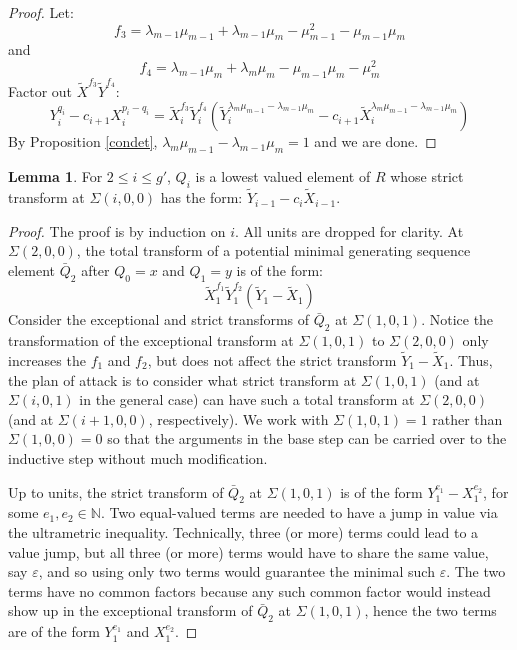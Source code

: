 \documentclass[11pt]{amsart}
\theoremstyle{definition}
\newtheorem{lem}[thm]{Lemma}
\begin{document}
{\begin{proof}
Let:
\begin{equation*}
f_3=\lambda_{m-1}\mu_{m-1}+\lambda_{m-1}\mu_m-\mu_{m-1}^2-\mu_{m-1}\mu_m
\end{equation*}
and
\begin{equation*}
f_4=\lambda_{m-1}\mu_m+\lambda_m\mu_m-\mu_{m-1}\mu_m-\mu_m^2
\end{equation*}
Factor out $\tilde X^{f_3}\tilde Y^{f_4}$:
\begin{equation*}
Y_{i}^{q_i} - c_{i+1}X_{i}^{p_i-q_i} = \tilde X_i^{f_3} \tilde Y_i^{f_4}\left(\tilde Y_i^{\lambda_m \mu_{m-1} - \lambda_{m-1} \mu_m} - c_{i+1}\tilde X_i^{\lambda_m\mu_{m-1}-\lambda_{m-1}\mu_m}\right)
\end{equation*}
By Proposition \ref{condet}, $\lambda_m\mu_{m-1}-\lambda_{m-1}\mu_m=1$ and we are done.
\end{proof}

\begin{lem} \label{minimalvalue}
For $2\leq i\leq g'$, $Q_i$ is a lowest valued element of $R$ whose strict transform at $\Sigma(i,0,0)$ has the form: $\tilde Y_{i-1}-c_i\tilde X_{i-1}$.
\end{lem}

\begin{proof}
The proof is by induction on $i$. All units are dropped for clarity. At $\Sigma(2,0,0)$, the total transform of a potential minimal generating sequence element $\bar Q_2$ after $Q_0=x$ and $Q_1=y$ is of the form:
\begin{equation*}
\tilde X_1^{f_1}\tilde Y_1^{f_2}\left(\tilde Y_1 - \tilde X_1\right)
\end{equation*}
Consider the exceptional and strict transforms of $\bar Q_2$ at $\Sigma(1,0,1)$. Notice the transformation of the exceptional transform at $\Sigma(1,0,1)$ to $\Sigma(2,0,0)$  only increases the $f_1$ and $f_2$, but does not affect the strict transform $\tilde Y_1 - \tilde X_1$. Thus, the plan of attack is to consider what strict transform at $\Sigma(1,0,1)$ (and at $\Sigma(i,0,1)$ in the general case) can have such a total transform at $\Sigma(2,0,0)$ (and at $\Sigma(i+1,0,0)$, respectively). We work with $\Sigma(1,0,1)=1$ rather than $\Sigma(1,0,0)=0$ so that the arguments in the base step can be carried over to the inductive step without much modification.

Up to units, the strict transform of $\bar Q_2$ at $\Sigma(1,0,1)$ is of the form $Y_1^{e_1}-X_1^{e_2}$, for some $e_1,e_2\in\mathbb{N}$. Two equal-valued terms are needed to have a jump in value via the ultrametric inequality. Technically, three (or more) terms could lead to a value jump, but all three (or more) terms would have to share the same value, say $\varepsilon$, and so using only two terms would guarantee the minimal such $\varepsilon$. The two terms have no common factors because any such common factor would instead show up in the exceptional transform of $\bar Q_2$ at $\Sigma(1,0,1)$, hence the two terms are of the form $Y_1^{e_1}$ and $X_1^{e_2}$.


\end{proof}}
\end{document}
